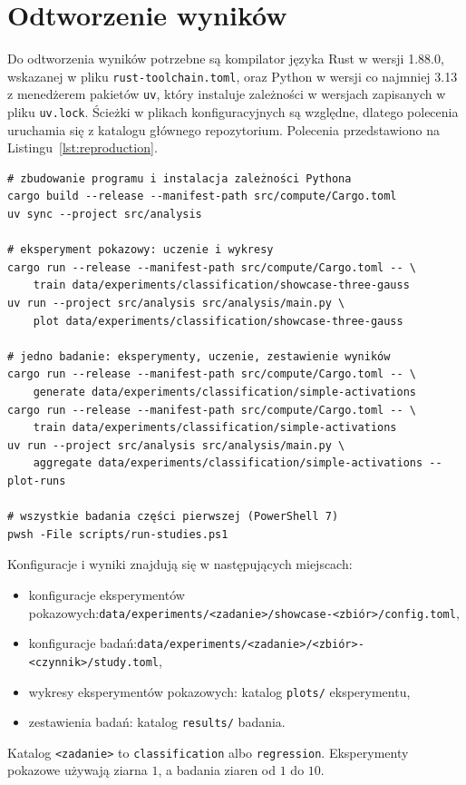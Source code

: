 \section{Odtworzenie wyników}
\label{app:reproduction}

Do odtworzenia wyników potrzebne są kompilator języka Rust w wersji 1.88.0, wskazanej w pliku \texttt{rust-toolchain.toml}, oraz Python w wersji co najmniej 3.13 z menedżerem pakietów \texttt{uv}, który instaluje zależności w wersjach zapisanych w pliku \texttt{uv.lock}. Ścieżki w plikach konfiguracyjnych są względne, dlatego polecenia uruchamia się z katalogu głównego repozytorium. Polecenia przedstawiono na Listingu~\ref{lst:reproduction}.

\begin{code}
\begin{Verbatim}[fontsize=\small]
# zbudowanie programu i instalacja zależności Pythona
cargo build --release --manifest-path src/compute/Cargo.toml
uv sync --project src/analysis

# eksperyment pokazowy: uczenie i wykresy
cargo run --release --manifest-path src/compute/Cargo.toml -- \
    train data/experiments/classification/showcase-three-gauss
uv run --project src/analysis src/analysis/main.py \
    plot data/experiments/classification/showcase-three-gauss

# jedno badanie: eksperymenty, uczenie, zestawienie wyników
cargo run --release --manifest-path src/compute/Cargo.toml -- \
    generate data/experiments/classification/simple-activations
cargo run --release --manifest-path src/compute/Cargo.toml -- \
    train data/experiments/classification/simple-activations
uv run --project src/analysis src/analysis/main.py \
    aggregate data/experiments/classification/simple-activations --plot-runs

# wszystkie badania części pierwszej (PowerShell 7)
pwsh -File scripts/run-studies.ps1
\end{Verbatim}
    \caption{Polecenia odtwarzające wyniki, uruchamiane z katalogu głównego repozytorium.}
    \label{lst:reproduction}
\end{code}

Konfiguracje i wyniki znajdują się w następujących miejscach:
\begin{itemize}
    \item konfiguracje eksperymentów pokazowych:\newline \texttt{data/experiments/<zadanie>/showcase-<zbiór>/config.toml},
    \item konfiguracje badań:\newline \texttt{data/experiments/<zadanie>/<zbiór>-<czynnik>/study.toml},
    \item wykresy eksperymentów pokazowych: katalog \texttt{plots/} eksperymentu,
    \item zestawienia badań: katalog \texttt{results/} badania.
\end{itemize}
Katalog \texttt{<zadanie>} to \texttt{classification} albo \texttt{regression}. Eksperymenty pokazowe używają ziarna $1$, a badania ziaren od $1$ do $10$.

